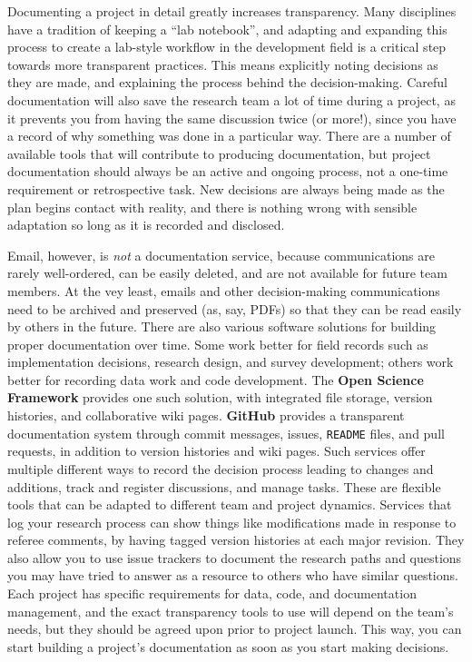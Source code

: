 Documenting a project in detail greatly increases transparency.
Many disciplines have a tradition of keeping a ``lab notebook'',
and adapting and expanding this process to create a
lab-style workflow in the development field is a
critical step towards more transparent practices.
This means explicitly noting decisions as they are made,
and explaining the process behind the decision-making.
Careful documentation will also save the research team a lot of time during a project,
as it prevents you from having the same discussion twice (or more!),
since you have a record of why something was done in a particular way.
There are a number of available tools
that will contribute to producing documentation,
but project documentation should always be an active and ongoing process,
not a one-time requirement or retrospective task.
New decisions are always being made as the plan begins contact with reality,
and there is nothing wrong with sensible adaptation so long as it is recorded and disclosed.

Email, however, is \textit{not} a documentation service, because communications are rarely well-ordered,
can be easily deleted, and are not available for future team members.
At the vey least, emails and other decision-making communications
need to be archived and preserved (as, say, PDFs)
so that they can be read easily by others in the future.
There are also various software solutions for building proper documentation over time.
Some work better for field records such as implementation decisions,
research design, and survey development;
others work better for recording data work and code development.
The \textbf{Open Science Framework} provides one such solution,
with integrated file storage, version histories, and collaborative wiki pages.
\textbf{GitHub} provides a transparent documentation system
through commit messages, issues, \texttt{README} files, and pull requests,
in addition to version histories and wiki pages.
Such services offer multiple different ways
to record the decision process leading to changes and additions,
track and register discussions, and manage tasks.
These are flexible tools that can be adapted to different team and project dynamics.
Services that log your research process can show things like modifications made in response to referee comments,
by having tagged version histories at each major revision.
They also allow you to use issue trackers
to document the research paths and questions you may have tried to answer
as a resource to others who have similar questions.
Each project has specific requirements for data, code, and documentation management,
and the exact transparency tools to use will depend on the team's needs,
but they should be agreed upon prior to project launch.
This way, you can start building a project's documentation as soon as you start making decisions.

